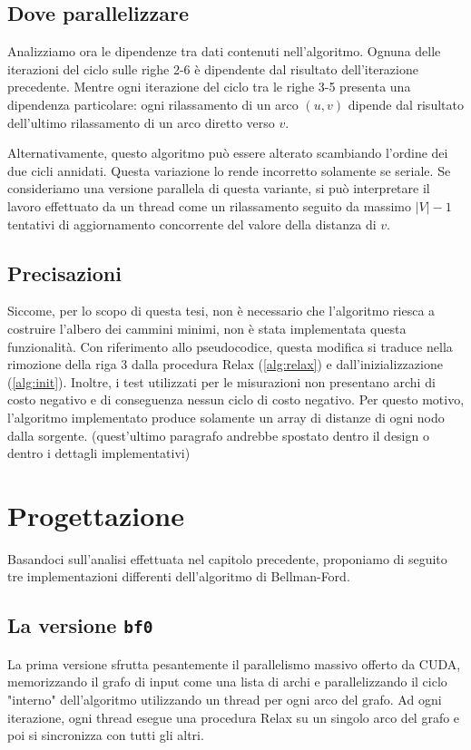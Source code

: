\documentclass[12pt,a4paper]{book}
\begin{document}
	\section{Dove parallelizzare}
	Analizziamo ora le dipendenze tra dati contenuti nell'algoritmo. Ognuna delle iterazioni del ciclo sulle righe 2-6 è dipendente dal risultato dell'iterazione precedente. Mentre ogni iterazione del ciclo tra le righe 3-5 presenta una dipendenza particolare: ogni rilassamento di un arco $(u,v)$ dipende dal risultato dell'ultimo rilassamento di un arco diretto verso $v$.
	
	Alternativamente, questo algoritmo può essere alterato scambiando l'ordine dei due cicli annidati. Questa variazione lo rende incorretto solamente se seriale. Se consideriamo una versione parallela di questa variante, si può interpretare il lavoro effettuato da un thread come un rilassamento seguito da massimo $|V|-1$ tentativi di aggiornamento concorrente del valore della distanza di $v$.
	
	\section{Precisazioni}
	Siccome, per lo scopo di questa tesi, non è necessario che l'algoritmo riesca a costruire l'albero dei cammini minimi, non è stata implementata questa funzionalità. Con riferimento allo pseudocodice, questa modifica si traduce nella rimozione della riga 3 dalla procedura Relax (\ref{alg:relax}) e dall'inizializzazione (\ref{alg:init}). Inoltre, i test utilizzati per le misurazioni non presentano archi di costo negativo e di conseguenza nessun ciclo di costo negativo. Per questo motivo, l'algoritmo implementato produce solamente un array di distanze di ogni nodo dalla sorgente.
	(quest'ultimo paragrafo andrebbe spostato dentro il design o dentro i dettagli implementativi)
	
	\chapter{Progettazione}
	\label{section:design}
	Basandoci sull'analisi effettuata nel capitolo precedente, proponiamo di seguito tre implementazioni differenti dell'algoritmo di Bellman-Ford.
	
	\section{La versione \texttt{bf0}}
	La prima versione sfrutta pesantemente il parallelismo massivo offerto da CUDA, memorizzando il grafo di input come una lista di archi e parallelizzando il ciclo "interno" dell'algoritmo utilizzando un thread per ogni arco del grafo. Ad ogni iterazione, ogni thread esegue una procedura Relax su un singolo arco del grafo e poi si sincronizza con tutti gli altri.
	
\end{document}
